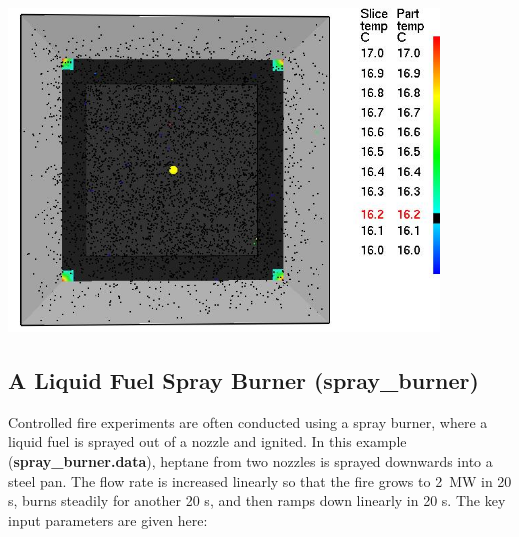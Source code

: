 \documentclass[11pt]{book}
\begin{document}
\begin{center}
\includegraphics[width=4.5in]{FIGURES/water_evaporation}
\end{center}







\clearpage

\subsection{A Liquid Fuel Spray Burner ({\bf spray\_burner}) }

Controlled fire experiments are often conducted using a spray burner,
where a liquid fuel is sprayed out of a nozzle and ignited. In this
example ({\bf spray\_burner.data}), heptane from two nozzles is
sprayed downwards into a steel pan.  The flow rate is increased
linearly so that the fire grows to 2~MW in 20 s, burns steadily for
another 20 s, and then ramps down linearly in 20 s. The key input
parameters are given here:
\end{document}
